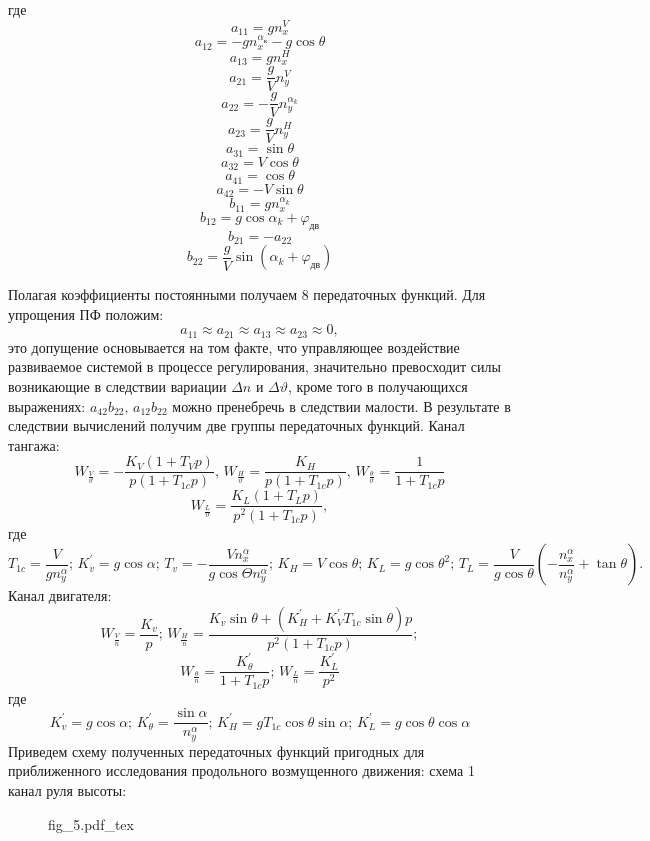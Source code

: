 \documentclass{article}
\begin{document}
где
\[
    a_{11} = g n_x^V
\]
\[
    a_{12} = -g n_x^{\alpha_\text{к}} - g \cos{\theta}
\]
\[
    a_{13} = g n_x^H
\]
\[
    a_{21} = \frac{g}{V} n_y ^V
\]
\[
    a_{22} = -\frac{g}{V} n_y^{\alpha_k}
\]
\[
    a_{23} = \frac{g}{V} n_y^H
\]
\[
    a_{31} = \sin{\theta}
\]
\[
    a_{32} = V \cos{\theta}
\]
\[
    a_{41} = \cos{\theta}
\]
\[
    a_{42} = -V \sin{\theta}
\]
\[
    b_{11} = gn_x^{\alpha_k}
\]
\[
    b_{12} = g \cos{\alpha_k + \varphi_\text{дв}}
\]
\[
    b_{21} = -a_{22}
\]
\[
    b_{22} = \frac{g}{V} \sin{(\alpha_k + \varphi_\text{дв})}
\]

Полагая коэффициенты постоянными получаем 8 передаточных функций. Для упрощения
ПФ положим:
\[
    a_{11} \approx a_{21} \approx a_{13} \approx a_{23} \approx 0,
\]
это допущение основывается на том факте, что управляющее воздействие
развиваемое системой в процессе регулирования, значительно превосходит силы
возникающие в следствии вариации $\Delta n$ и $\Delta \vartheta$, кроме того в
получающихся выражениях:
$a_{42} b_{22}, \, a_{12} b_{22}$ можно пренебречь в следствии малости.
В результате в следствии вычислений получим две группы передаточных функций.
Канал тангажа:
\[
    W_{\frac{V}{\vartheta}} = -\frac{K_V(1+T_Vp)}{p(1+T_{1c}p)}, \,
    W_{\frac{H}{\vartheta}} = \frac{K_H}{p(1+T_{1c}p)}, \,
    W_{\frac{\theta}{\vartheta}} = \frac{1}{1+T_{1c}p}
\]
\[
    W_{\frac{L}{\vartheta}} = \frac{K_L(1+T_Lp)}{p^2(1+T_{1c}p)},
\]
где
\[
    T_{1c} = \frac{V}{g n_y^\alpha}; \, K_v^{'} = g\cos{\alpha}; \, T_v =
    -\frac{V n_x^\alpha}{g \cos{\Theta} n_y^\alpha};\, K_H = V \cos{\theta}; \,
    K_L = g \cos{\theta}^2 ;\, T_L= \frac{V}{g \cos{\theta}} (-
    \frac{n_x^\alpha}{n_y^\alpha} + \tan{\theta}).
\]
Канал двигателя:
\[
    W_{\frac{V}{n}} = \frac{K_v}{p};\, W_{\frac{H}{n}} = \frac{K_v \sin{\theta}
    + (K_H^{'} + K_V^{'} T_{1c} \sin{\theta})p}{p^2(1+T_{1c}p)};
\]
\[
    W_{\frac{\theta}{n}} = \frac{K_\theta^{'}}{1+T_{1c}p}; \, W_{\frac{L}{n}} =
    \frac{K_L^{'}}{p^2}
\]
где
\[
    K_v^{'} = g\cos{\alpha}; \, K_\theta^{'} = \frac{\sin{\alpha}}{n_y^\alpha};
    \, K_H^{'} = gT_{1c} \cos{\theta}\sin{\alpha};\, K_L^{'} = g\cos{\theta}
    \cos{\alpha}
\]
Приведем схему полученных передаточных функций пригодных для приближенного
исследования продольного возмущенного движения:
схема 1 канал руля высоты:
\begin{figure}[ht]
    {fig_5.pdf_tex}
\end{figure}
\end{document}
